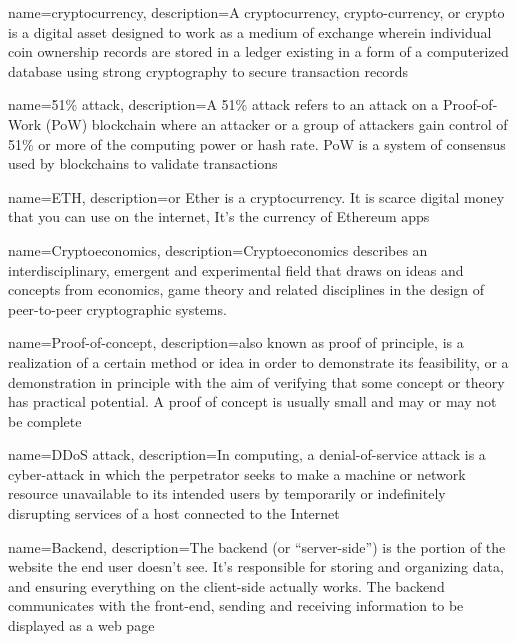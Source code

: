 \makeglossaries
 
{
    name=cryptocurrency,
    description={A cryptocurrency, crypto-currency, or crypto is a digital asset designed to work as a medium of exchange wherein individual coin ownership records are stored in a ledger existing in a form of a computerized database using strong cryptography to secure transaction records}
}

{
    name=51\% attack,
    description={A 51\% attack refers to an attack on a Proof-of-Work (PoW) blockchain where an attacker or a group of attackers gain control of 51\% or more of the computing power or hash rate. PoW is a system of consensus used by blockchains to validate transactions}
}

{
    name=ETH,
    description={or Ether is a cryptocurrency. It is scarce digital money that you can use on the internet, It's the currency of Ethereum apps}
}

{
    name=Cryptoeconomics,
    description={Cryptoeconomics describes an interdisciplinary, emergent and experimental field that draws on ideas and concepts from economics, game theory and related disciplines in the design of peer-to-peer cryptographic systems.}
}

{
    name=Proof-of-concept,
    description={also known as proof of principle, is a realization of a certain method or idea in order to demonstrate its feasibility, or a demonstration in principle with the aim of verifying that some concept or theory has practical potential. A proof of concept is usually small and may or may not be complete}
}

{
    name=DDoS attack,
    description={In computing, a denial-of-service attack is a cyber-attack in which the perpetrator seeks to make a machine or network resource unavailable to its intended users by temporarily or indefinitely disrupting services of a host connected to the Internet}
}

{
    name=Backend,
    description={The backend (or “server-side”) is the portion of the website the end user doesn't see. It's responsible for storing and organizing data, and ensuring everything on the client-side actually works. The backend communicates with the front-end, sending and receiving information to be displayed as a web page}
}
